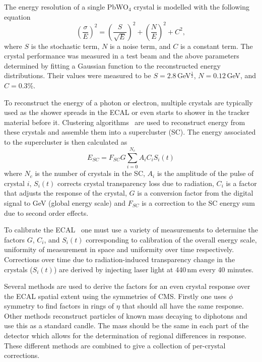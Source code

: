 The energy resolution of a single PbWO$_{4}$ crystal is modelled with the following equation~\cite{CMSPhysics}
\begin{equation}
    \label{eq:apparatus:ecal_energy_reso}
        \left( \frac{\sigma}{E} \right)^{2} =  
        \left( \frac{S}{\sqrt{E}} \right)^{2} +  
        \left( \frac{N}{E} \right)^{2} +  
        C^{2},
\end{equation}
where $S$ is the stochastic term, $N$ is a noise term, and $C$ is a constant term. The crystal performance was measured in a test beam and the above parameters determined by fitting a Gaussian function to the reconstructed energy distributions. Their values were measured to be $S=2.8$\,GeV$^{\frac{1}{2}}$, $N=0.12$\,GeV, and $C=0.3$\%.

To reconstruct the energy of a photon or electron, multiple crystals are typically used as the shower spreads in the ECAL or even starts to shower in the tracker material before it.
Clustering algorithms~\cite{ecalShower} are used to reconstruct energy from these crystals and assemble them into a supercluster (SC). The energy associated to the supercluster is then calculated as
\begin{equation}
    E_{SC} = F_{SC}G\sum^{N_{c}}_{i=0}A_{i}C_{i}S_{i}(t)
\end{equation}
where $N_{c}$ is the number of crystals in the SC, $A_{i}$ is the amplitude of the pulse of crystal $i$, $S_{i}(t)$ corrects crystal transparency loss due to radiation, $C_{i}$ is a factor that adjusts the response of the crystal, $G$ is a conversion factor from the digital signal to GeV (global energy scale) and $F_{SC}$ is a correction to the SC energy sum due to second order effects.

To calibrate the ECAL~\cite{cmsEcalCalibration} one must use a variety of measurements to determine the factors $G$, $C_{i}$, and $S_{i}(t)$ corresponding to calibration of the overall energy scale, uniformity of measurement in space and uniformity over time respectively. 
Corrections over time due to radiation-induced transparency change in the crystals ($S_{i}(t)$) are derived by injecting laser light at 440\,nm every 40 minutes. 

Several methods are used to derive the factors for an even crystal response over the ECAL spatial extent using the symmetries of CMS. Firstly one uses $\phi$ symmetry to find factors in rings of $\eta$ that should all have the same response. 
Other methods reconstruct particles of known mass decaying to diphotons and use this as a standard candle. The mass should be the same in each part of the detector which allows for the determination of regional differences in response. These different methods are combined to give a collection of per-crystal corrections. 

